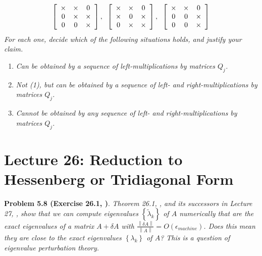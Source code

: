 \documentclass[a4paper,oneside]{book}
\numberwithin{equation}{chapter}
\begin{document}
\begin{align}
\left[ {\begin{array}{*{20}{c}}
 \times & \times &0\\
0& \times & \times \\
0&0& \times 
\end{array}} \right],\hspace{0.2cm} \left[ {\begin{array}{*{20}{c}}
 \times & \times &0\\
 \times &0& \times \\
0& \times & \times 
\end{array}} \right],\hspace{0.2cm} \left[ {\begin{array}{*{20}{c}}
 \times & \times &0\\
0&0& \times \\
0&0& \times 
\end{array}} \right]
\end{align}
\textit{For each one, decide which of the following situations holds, and justify your claim.}
\begin{enumerate}
\item \textit{Can be obtained by a sequence of left-multiplications by matrices $Q_j$.}
\item \textit{Not (1), but can be obtained by a sequence of left- and right-multiplications by matrices $Q_j$.}
\item \textit{Cannot be obtained by any sequence of left- and right-multiplications by matrices $Q_j$.}
\end{enumerate}






\section{Lecture 26: Reduction to Hessenberg or Tridiagonal Form}
\textbf{Problem 5.8 (Exercise 26.1, \cite{1})}. \textit{Theorem 26.1, \cite{1}, and its successors in Lecture 27, \cite{1}, show that we can compute eigenvalues $\left\{ {{{\tilde \lambda }_k}} \right\}$ of $A$ numerically that are the exact eigenvalues of a matrix $A+\delta A$ with $\frac{{\left\| {\delta A} \right\|}}{{\left\| A \right\|}} = O\left( {{\epsilon _{machine}}} \right)$. Does this mean they are close to the exact eigenvalues $\left\{ {{\lambda _k}} \right\}$  of $A$? This is a question of eigenvalue perturbation theory.}
\end{document}
